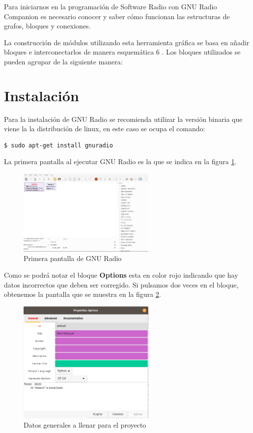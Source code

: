 Para iniciarnos en la programación de Software Radio con GNU Radio Companion es
necesario conocer y saber cómo funcionan las estructuras de grafos, bloques y conexiones.

La construcción de módulos utilizando esta herramienta gráfica se basa en añadir bloques e
interconectarlos de manera esquemática 6 . Los bloques utilizados se pueden agrupar de la
siguiente manera:

\section{Instalación}

Para la instalación de GNU Radio se recomienda utilizar la versión binaria que viene la la distribución de linux, en este caso se ocupa el comando:

\begin{lstlisting}
$ sudo apt-get install gnuradio
\end{lstlisting}

La primera pantalla al ejecutar GNU Radio es la que se indica en la figura \ref{cap1:004}.

\begin{figure}[htb]
	\centering
	\includegraphics[width=0.6\textwidth]{capitulo1/primerapantalla.png}
	\caption{Primera pantalla de GNU Radio}
	\label{cap1:004}
\end{figure}

Como se podrá notar el bloque \textbf{Options} esta en color rojo indicando que hay datos incorrectos que deben ser corregido. Si pulsamos dos veces en el bloque, obtenemos la pantalla que se muestra en la figura \ref{cap1:005}.

\begin{figure}[htb]
	\centering
	\includegraphics[width=0.6\textwidth]{capitulo1/datosgenerales.png}
	\caption{Datos generales a llenar para el proyecto}
	\label{cap1:005}
\end{figure}

